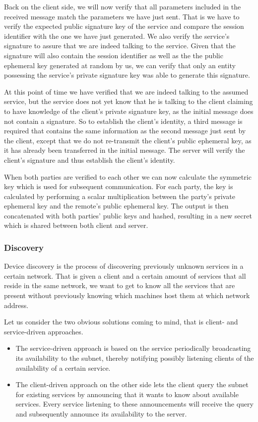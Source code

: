 Back on the client side, we will now verify that all parameters included in the received message match the parameters we have just sent.
That is we have to verify the expected public signature key of the service and compare the session identifier with the one we have just generated.
We also verify the service's signature to assure that we are indeed talking to the service.
Given that the signature will also contain the session identifier as well as the the public ephemeral key generated at random by us, we can verify that only an entity possessing the service's private signature key was able to generate this signature.

At this point of time we have verified that we are indeed talking to the assumed service, but the service does not yet know that he is talking to the client claiming to have knowledge of the client's private signature key, as the initial message does not contain a signature.
So to establish the client's identity, a third message is required that contains the same information as the second message just sent by the client, except that we do not re-transmit the client's public ephemeral key, as it has already been transferred in the initial message.
The server will verify the client's signature and thus establish the client's identity.

When both parties are verified to each other we can now calculate the symmetric key which is used for subsequent communication.
For each party, the key is calculated by performing a scalar multiplication between the party's private ephemeral key and the remote's public ephemeral key.
The output is then concatenated with both parties' public keys and hashed, resulting in a new secret which is shared between both client and server.

\subsubsection{Discovery}
\label{sec:discovery}

Device discovery is the process of discovering previously unknown services in a certain network.
That is given a client and a certain amount of services that all reside in the same network, we want to get to know all the services that are present without previously knowing which machines host them at which network address.

Let us consider the two obvious solutions coming to mind, that is client- and service-driven approaches.
\begin{itemize}
    \item The service-driven approach is based on the service periodically broadcasting its availability to the subnet, thereby notifying possibly listening clients of the availability of a certain service.
    \item The client-driven approach on the other side lets the client query the subnet for existing services by announcing that it wants to know about available services.
        Every service listening to these announcements will receive the query and subsequently announce its availability to the server.
\end{itemize}

